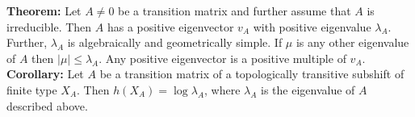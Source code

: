 \documentclass[12pt]{article}
\begin{document}
\textbf{Theorem:} Let $A \neq 0$ be a transition matrix and further assume that $A$ is irreducible. Then $A$ has a positive eigenvector $v_A$ with positive eigenvalue $\lambda_A$. Further, $\lambda_A$ is algebraically and geometrically simple. If $\mu$ is any other eigenvalue of $A$ then $|\mu| \leq \lambda_A$. Any positive eigenvector is a positive multiple of $v_A$.\\

\textbf{Corollary:} Let $A$ be a transition matrix of a topologically transitive subshift of finite type $X_A$. Then $h(X_A) = \log \lambda_A$, where $\lambda_A$ is the eigenvalue of $A$ described above.
\end{document}
